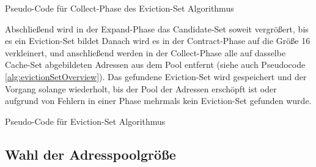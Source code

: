 \begin{algorithm}[h]
\DontPrintSemicolon
\caption{Pseudo-Code für Collect-Phase des Eviction-Set Algorithmus}
\label{alg:evictionSetCollect}

\end{algorithm}

Abschließend wird in der Expand-Phase das Candidate-Set soweit vergrößert, bis es ein Eviction-Set bildet Danach wird es in der Contract-Phase auf die Größe 16 verkleinert, und anschließend werden in der Collect-Phase  alle auf dasselbe Cache-Set abgebildeten Adressen aus dem Pool entfernt (siehe auch Pseudocode \ref{alg:evictionSetOverview}).
Das gefundene Eviction-Set wird gespeichert und der Vorgang solange wiederholt, bis der Pool der Adressen erschöpft ist oder aufgrund von Fehlern in einer Phase mehrmals kein Eviction-Set gefunden wurde.

\begin{algorithm}[h]
\DontPrintSemicolon
\caption{Pseudo-Code für Eviction-Set Algorithmus}
\label{alg:evictionSetOverview}

\end{algorithm}

\subsection{Wahl der Adresspoolgröße}
\label{addressPoolSize}

